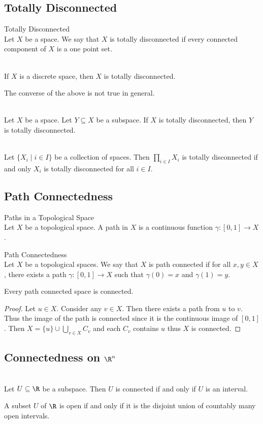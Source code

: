 \documentclass[a4paper]{article}
\begin{document}
\subsection{Totally Disconnected}
\begin{defn}{Totally Disconnected}{}\\
Let $X$ be a space. We say that $X$ is totally disconnected if every connected component of $X$ is a one point set. 
\end{defn}

\begin{eg}{}{}\\
If $X$ is a discrete space, then $X$ is totally disconnected. 
\end{eg}

The converse of the above is not true in general. 

\begin{prp}{}{}\\
Let $X$ be a space. Let $Y\subseteq X$ be a subspace. If $X$ is totally disconnected, then $Y$ is totally disconnected. 
\end{prp}

\begin{prp}{}{}\\
Let $\{X_i\;|\;i\in I\}$ be a collection of spaces. Then $\prod_{i\in I}X_i$ is totally disconnected if and only $X_i$ is totally disconnected for all $i\in I$. 
\end{prp}

\subsection{Path Connectedness}
\begin{defn}{Paths in a Topological Space}{}\\
Let $X$ be a topological space. A path in $X$ is a continuous function $\gamma:[0,1]\to X$. 
\end{defn}

\begin{defn}{Path Connectedness}{}\\
Let $X$ be a topological spaces. We say that $X$ is path connected if for all $x,y\in X$, there exists a path $\gamma:[0,1]\to X$ such that $\gamma(0)=x$ and $\gamma(1)=y$. 
\end{defn}

\begin{prp}{}{} Every path connected space is connected. 
\begin{proof}
Let $u\in X$. Consider any $v\in X$. Then there exists a path from $u$ to $v$. Thus the image of the path is connected since it is the continuous image of $[0,1]$. Then $X=\{u\}\cup\bigcup_{v\in X}C_v$ and each $C_v$ contains $u$ thus $X$ is connected. 
\end{proof}
\end{prp}

\subsection{Connectedness on $\R^n$}
\begin{prp}{}{}\\
Let $U\subseteq\R$ be a subspace. Then $U$ is connected if and only if $U$ is an interval. 
\end{prp}

\begin{prp}{}{} A subset $U$ of $\R$ is open if and only if it is the disjoint union of countably many open intervals. 
\end{prp}
\end{document}

